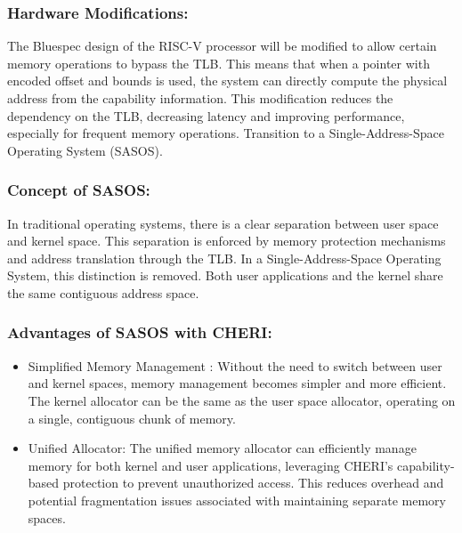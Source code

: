 \subsubsection{Hardware Modifications:}
The Bluespec design of the RISC-V processor will be modified to allow certain memory operations to bypass the TLB. This means that when a pointer with encoded offset and bounds is used, the system can directly compute the physical address from the capability information.
This modification reduces the dependency on the TLB, decreasing latency and improving performance, especially for frequent memory operations.
Transition to a Single-Address-Space Operating System (SASOS)\cite{esswood_cherios_nodate}.
\subsubsection{Concept of SASOS:}
In traditional operating systems, there is a clear separation between user space and kernel space. This separation is enforced by memory protection mechanisms and address translation through the TLB.
In a Single-Address-Space Operating System, this distinction is removed. Both user applications and the kernel share the same contiguous address space.
\subsubsection{Advantages of SASOS with CHERI:}
\begin{itemize}
  \item Simplified Memory Management : Without the need to switch between user and kernel spaces, memory management becomes simpler and more efficient.
The kernel allocator can be the same as the user space allocator, operating on a single, contiguous chunk of memory.
  \item Unified Allocator: The unified memory allocator can efficiently manage memory for both kernel and user applications, leveraging CHERI's capability-based protection to prevent unauthorized access.
This reduces overhead and potential fragmentation issues associated with maintaining separate memory spaces.
\end{itemize}